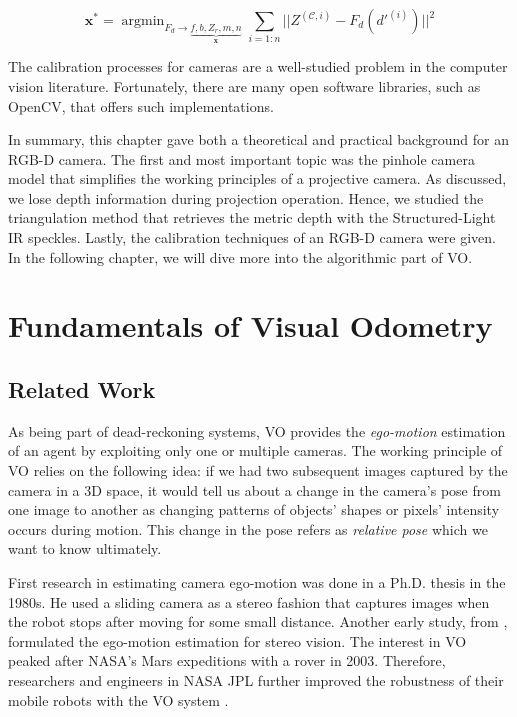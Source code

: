 \documentclass[a4paper]{report}
\numberwithin{figure}{section}
\newcommand{\argmin}{\mathop{\mathrm{argmin}}}
\begin{document}
\begin{equation}\label{eq:proj_lsq}
  \mathbf{x^*} = 
  \argmin_{F_d \rightarrow \underbrace{f, b, Z_r, m, n}_{\mathbf{x}}}
  \sum_{i=1:n} || Z^{(\mathcal{C}, i)} - F_d(d'^{(i)})  ||^2
\end{equation}

The calibration processes for cameras are a well-studied problem in the 
computer 
vision literature.  Fortunately, there are many open software libraries, such 
as OpenCV, that offers such implementations.

In summary, this chapter gave both a theoretical and practical background 
for an RGB-D camera. The first and most important topic was the pinhole 
camera model that simplifies the working principles of a projective camera. 
As discussed, we lose depth information during projection operation. Hence, 
we studied the triangulation method that retrieves the metric depth 
with the Structured-Light IR speckles. Lastly, the calibration techniques of 
an RGB-D camera were given. In the following chapter, we will dive more 
into the algorithmic part of VO.

\chapter{Fundamentals of Visual Odometry} \label{cp_vo}

\section{Related Work} \label{sc_visual_odometry_related_works}

As being part of dead-reckoning systems, VO provides the \textit{ego-motion}
estimation of an agent by exploiting only one or multiple cameras. The working
principle of VO relies on the following idea: if we had two subsequent images
captured by the camera in a 3D space, it would tell us about a change in the 
camera's
pose from one image to another as changing patterns of objects' shapes or
pixels' intensity occurs during motion.  This change in the pose refers as
\textit{relative pose} which we want to know ultimately.

First research in estimating camera ego-motion was done in a Ph.D. thesis 
\parencite{Moravec1980} in the 1980s. He used a sliding camera as a stereo 
fashion 
that captures images when the robot stops after moving for some small 
distance. Another early study, from  
\parencite{Matthies1987a}, 
formulated the ego-motion estimation for stereo vision. The interest in VO 
peaked after NASA's Mars expeditions with a rover in 2003. Therefore, 
researchers and 
engineers in NASA JPL further improved the robustness of their mobile robots 
with the VO system \parencite{Olson2003}.
\end{document}
